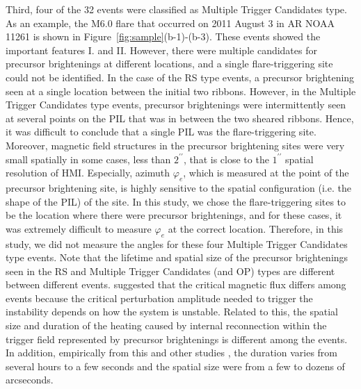 \documentclass[10pt,preprint2]{aastex}
\begin{document}
Third, four of the 32 events were classified as Multiple Trigger Candidates type.
As an example, the M6.0 flare that occurred on 2011 August 3 in AR NOAA 11261 is shown in Figure~\ref{fig:sample}(b-1)-(b-3).
These events showed the important features I. and I\hspace{-1pt}I.
However, there were multiple candidates for precursor brightenings at different locations, and a single flare-triggering site could not be identified.
In the case of the RS type events, a precursor brightening seen at a single location between the initial two ribbons.
However, in the Multiple Trigger Candidates type events, precursor brightenings were intermittently seen at several points on the PIL that was in between the two sheared ribbons.
Hence, it was difficult to conclude that a single PIL was the flare-triggering site.
Moreover, magnetic field structures in the precursor brightening sites were very small spatially in some cases, less than $2^{\prime\prime}$, that is close to the $1^{\prime\prime}$ spatial resolution of HMI.
Especially, azimuth $\varphi_{e}$, which is measured at the point of the precursor brightening site, is highly sensitive to the spatial configuration (i.e. the shape of the PIL) of the site.
In this study, we chose the flare-triggering sites to be the location where there were precursor brightenings, and for these cases, it was extremely difficult to measure $\varphi_{e}$ at the correct location.
Therefore, in this study, we did not measure the angles for these four Multiple Trigger Candidates type events.
Note that the lifetime and spatial size of the precursor brightenings seen in the RS and Multiple Trigger Candidates (and OP) types are different between different events.
\citet{bamba13} suggested that the critical magnetic flux differs among events because the critical perturbation amplitude needed to trigger the instability depends on how the system is unstable.
Related to this, the spatial size and duration of the heating caused by internal reconnection within the trigger field represented by precursor brightenings is different among the events.
In addition, empirically from this and other studies \citep{bamba13, bamba14, Palacios15, bamba17a, bamba17b, Wang17, Woods17}, the duration varies from several hours to a few seconds and the spatial size were from a few to dozens of arcseconds.
\end{document}

